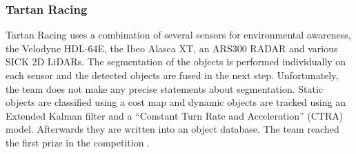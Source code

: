\documentclass[11pt,oneside,openright]{mpreport}
\begin{document}
\subsubsection{Tartan Racing}
Tartan Racing \cite{Urmson2007} uses a combination of several sensors for environmental awareness, the Velodyne HDL-64E, the Ibeo Alasca XT, an ARS300 RADAR and various SICK 2D LiDARs.
The segmentation of the objects is performed individually on each sensor and the detected objects are fused in the next step. Unfortunately,
the team does not make any precise statements about segmentation. Static objects are classified using a cost map and dynamic objects are tracked using an
Extended Kalman filter and a ``Constant Turn Rate and Acceleration'' (CTRA) model. Afterwards they are written into an object database. The team reached the first prize in the competition \cite{Release2007}.
\end{document}
